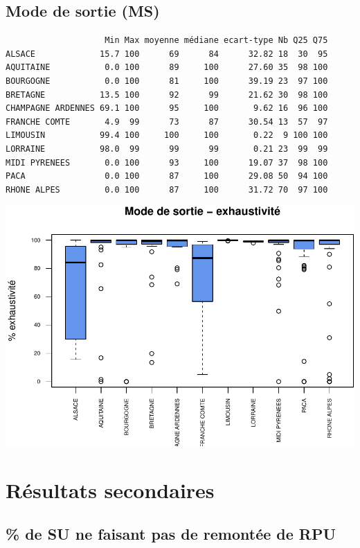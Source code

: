 \documentclass[]{article}
\begin{document}
\subsection{Mode de sortie (MS)}\label{mode-de-sortie-ms-2}

\begin{verbatim}
                    Min Max moyenne médiane ecart-type Nb Q25 Q75
ALSACE             15.7 100      69      84      32.82 18  30  95
AQUITAINE           0.0 100      89     100      27.60 35  98 100
BOURGOGNE           0.0 100      81     100      39.19 23  97 100
BRETAGNE           13.5 100      92      99      21.62 30  98 100
CHAMPAGNE ARDENNES 69.1 100      95     100       9.62 16  96 100
FRANCHE COMTE       4.9  99      73      87      30.54 13  57  97
LIMOUSIN           99.4 100     100     100       0.22  9 100 100
LORRAINE           98.0  99      99      99       0.21 23  99  99
MIDI PYRENEES       0.0 100      93     100      19.07 37  98 100
PACA                0.0 100      87     100      29.08 50  94 100
RHONE ALPES         0.0 100      87     100      31.72 70  97 100
\end{verbatim}

\includegraphics{septembre2015_files/figure-latex/unnamed-chunk-34-1.pdf}

\section{Résultats secondaires}\label{resultats-secondaires}

\subsection{\% de SU ne faisant pas de remontée de
RPU}\label{de-su-ne-faisant-pas-de-remontee-de-rpu}
\end{document}
